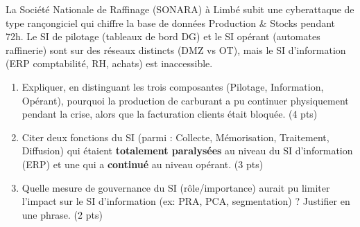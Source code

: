 \documentclass[11pt]{article}
\begin{document}
\begin{exercice}
La Société Nationale de Raffinage (SONARA) à Limbé subit une cyberattaque de type rançongiciel qui chiffre la base de données \og Production \& Stocks \fg{} pendant 72h. Le SI de pilotage (tableaux de bord DG) et le SI opérant (automates raffinerie) sont sur des réseaux distincts (DMZ vs OT), mais le SI d'information (ERP comptabilité, RH, achats) est inaccessible.

\begin{enumerate}
    \item Expliquer, en distinguant les trois composantes (Pilotage, Information, Opérant), pourquoi la production de carburant a pu continuer physiquement pendant la crise, alors que la facturation clients était bloquée. \hfill (4 pts)
    \item Citer deux fonctions du SI (parmi : Collecte, Mémorisation, Traitement, Diffusion) qui étaient \textbf{totalement paralysées} au niveau du SI d'information (ERP) et une qui a \textbf{continué} au niveau opérant. \hfill (3 pts)
    \item Quelle mesure de gouvernance du SI (rôle/importance) aurait pu limiter l'impact sur le SI d'information (ex: PRA, PCA, segmentation) ? Justifier en une phrase. \hfill (2 pts)
\end{enumerate}
\end{exercice}
\end{document}
